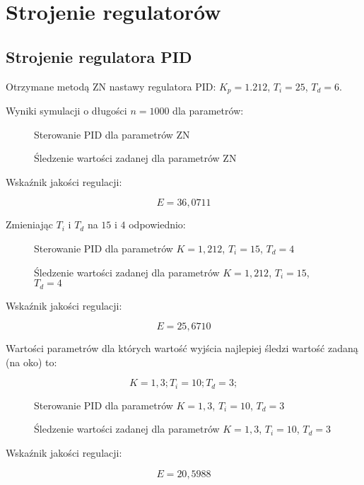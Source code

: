 \chapter{Strojenie regulatorów}

\section{Strojenie regulatora PID}

Otrzymane metodą ZN nastawy regulatora PID: $K_p = 1.212$, $T_i = 25$, $T_d = 6$.

Wyniki symulacji o długości $n = 1000$ dla parametrów:

\begin{figure}[H]
\centering

\caption{Sterowanie PID dla parametrów ZN}
\end{figure}

\begin{figure}[H]
\centering

\caption{Śledzenie wartości zadanej dla parametrów ZN}
\end{figure}

Wskaźnik jakości regulacji:

\begin{equation}
E = 36,0711
\end{equation}

Zmieniając $T_i$ i $T_d$ na $15$ i $4$ odpowiednio:

\begin{figure}[H]
\centering

\caption{Sterowanie PID dla parametrów $K = 1,212$, $T_i = 15$, $T_d = 4$}
\end{figure}

\begin{figure}[H]
\centering

\caption{Śledzenie wartości zadanej dla parametrów $K = 1,212$, $T_i = 15$, $T_d = 4$}
\end{figure}

Wskaźnik jakości regulacji:

\begin{equation}
E = 25,6710
\end{equation}

Wartości parametrów dla których wartość wyjścia najlepiej śledzi wartość zadaną (na oko) to:

\begin{equation}
K = 1,3; T_i = 10; T_d = 3;
\end{equation}

\begin{figure}[H]
\centering

\caption{Sterowanie PID dla parametrów $K = 1,3$, $T_i = 10$, $T_d = 3$}
\end{figure}

\begin{figure}[H]
\centering

\caption{Śledzenie wartości zadanej dla parametrów $K = 1,3$, $T_i = 10$, $T_d = 3$}
\end{figure}

Wskaźnik jakości regulacji:

\begin{equation}
E = 20,5988
\end{equation}
